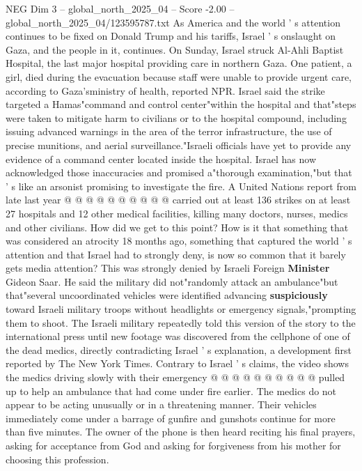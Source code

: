 \begin{textsample}{NEG Dim 3 – global\_north\_2025\_04 – Score -2.00 – global\_north\_2025\_04/123595787.txt}  \label{ex:f3_neg_400}
As America and the world ' s attention continues to be fixed on Donald Trump and his tariffs, Israel ' s onslaught on Gaza, and the people in it, continues.
On Sunday, Israel struck Al-Ahli Baptist Hospital, the last major hospital providing care in northern Gaza.
One patient, a girl, died during the evacuation because staff were unable to provide urgent care, according to Gaza'sministry of health, reported NPR.
Israel said the strike targeted a Hamas"command and control center"within the hospital and that"steps were taken to mitigate harm to civilians or to the hospital compound, including issuing advanced warnings in the area of the terror infrastructure, the use of precise munitions, and aerial surveillance."Israeli officials have yet to provide any evidence of a command center located inside the hospital.
Israel has now acknowledged those inaccuracies and promised a"thorough examination,"but that ' s like an arsonist promising to investigate the fire.
A United Nations report from late last year @ @ @ @ @ @ @ @ @ @ carried out at least 136 strikes on at least 27 hospitals and 12 other medical facilities, killing many doctors, nurses, medics and other civilians.
How did we get to this point?
How is it that something that was considered an atrocity 18 months ago, something that captured the world ' s attention and that Israel had to strongly deny, is now so common that it barely gets media attention?
This was strongly denied by Israeli Foreign \textbf{Minister} Gideon Saar.
He said the military did not"randomly attack an ambulance"but that"several uncoordinated vehicles were identified advancing \textbf{suspiciously} toward Israeli military troops without headlights or emergency signals,"prompting them to shoot.
The Israeli military repeatedly told this version of the story to the international press until new footage was discovered from the cellphone of one of the dead medics, directly contradicting Israel ' s explanation, a development first reported by The New York Times.
Contrary to Israel ' s claims, the video shows the medics driving slowly with their emergency @ @ @ @ @ @ @ @ @ @ pulled up to help an ambulance that had come under fire earlier.
The medics do not appear to be acting unusually or in a threatening manner.
Their vehicles immediately come under a barrage of gunfire and gunshots continue for more than five minutes.
The owner of the phone is then heard reciting his final prayers, asking for acceptance from God and asking for forgiveness from his mother for choosing this profession.

\end{textsample}
